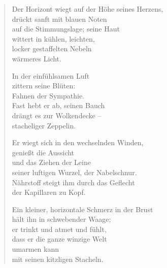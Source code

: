 
\cleartoverso


\vspace*{-\baselineskip}
\begin{verse}
Der Horizont wiegt auf der Höhe seines Herzens,\\
drückt sanft mit blauen Noten\\
auf die Stimmungslage; seine Haut\\
wittert in kühlen, leichten,\\
locker gestaffelten Nebeln\\
wärmeres Licht.

In der einfühlsamen Luft\\
zittern seine Blüten:\\
Fahnen der Sympathie.\\
Fast hebt er ab, seinen Bauch\\
drängt es zur Wolkendecke --\\
stacheliger Zeppelin.

Er wiegt sich in den wechselnden Winden,\\
genießt die Aussicht\\
und das Ziehen der Leine\\
seiner luftigen Wurzel, der Nabelschnur.\\
Nährstoff steigt ihm durch das Geflecht\\
der Kapillaren zu Kopf.

Ein kleiner, horizontale Schmerz in der Brust\\
hält ihn in schwebender Waage;\\
er trinkt und atmet und fühlt,\\
dass er die ganze winzige Welt\\
umarmen kann\\
mit seinen kitzligen Stacheln.
\end{verse}

\clearpage


